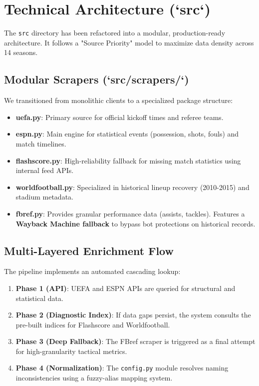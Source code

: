 \section{Technical Architecture (`src`)}
The \texttt{src} directory has been refactored into a modular, production-ready architecture. It follows a "Source Priority" model to maximize data density across 14 seasons.

\subsection{Modular Scrapers (`src/scrapers/`)}
We transitioned from monolithic clients to a specialized package structure:
\begin{itemize}
    \item \textbf{uefa.py}: Primary source for official kickoff times and referee teams.
    \item \textbf{espn.py}: Main engine for statistical events (possession, shots, fouls) and match timelines.
    \item \textbf{flashscore.py}: High-reliability fallback for missing match statistics using internal feed APIs.
    \item \textbf{worldfootball.py}: Specialized in historical lineup recovery (2010-2015) and stadium metadata.
    \item \textbf{fbref.py}: Provides granular performance data (assists, tackles). Features a \textbf{Wayback Machine fallback} to bypass bot protections on historical records.
\end{itemize}

\subsection{Multi-Layered Enrichment Flow}
The pipeline implements an automated cascading lookup:
\begin{enumerate}
    \item \textbf{Phase 1 (API)}: UEFA and ESPN APIs are queried for structural and statistical data.
    \item \textbf{Phase 2 (Diagnostic Index)}: If data gaps persist, the system consults the pre-built indices for Flashscore and Worldfootball.
    \item \textbf{Phase 3 (Deep Fallback)}: The FBref scraper is triggered as a final attempt for high-granularity tactical metrics.
    \item \textbf{Phase 4 (Normalization)}: The \texttt{config.py} module resolves naming inconsistencies using a fuzzy-alias mapping system.
\end{enumerate}

